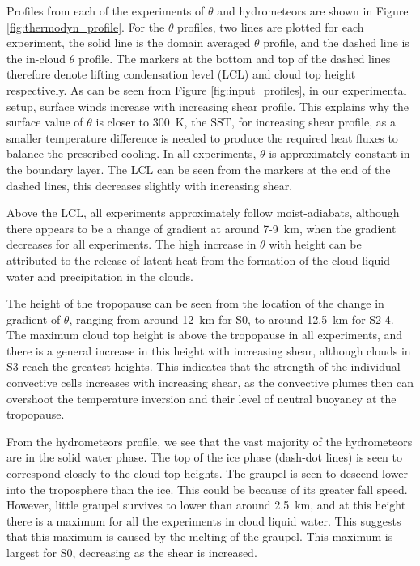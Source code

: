 \documentclass[11pt,a4paper]{article}
\newcommand\todo[1]{\textbf{TODO: #1}}
\begin{document}
Profiles from each of the experiments of $\theta$ and hydrometeors are shown in Figure \ref{fig:thermodyn_profile}. For the $\theta$ profiles, two lines are plotted for each experiment, the solid line is the domain averaged $\theta$ profile, and the dashed line is the in-cloud $\theta$ profile. The markers at the bottom and top of the dashed lines therefore denote lifting condensation level (LCL) and cloud top height respectively. As can be seen from Figure \ref{fig:input_profiles}, in our experimental setup, surface winds increase with increasing shear profile. This explains why the surface value of $\theta$ is closer to \SI{300}{K}, the SST, for increasing shear profile, as a smaller temperature difference is needed to produce the required heat fluxes to balance the prescribed cooling. In all experiments, $\theta$ is approximately constant in the boundary layer. The LCL can be seen from the markers at the end of the dashed lines, this decreases slightly with increasing shear. 

Above the LCL, all experiments approximately follow moist-adiabats,
although there appears to be a change of gradient at around \SI{7}{}-\SI{9}{km}, when the gradient decreases for all experiments. The high increase in $\theta$ with height can be attributed to the release of latent heat from the formation of the cloud liquid water and precipitation in the clouds.

The height of the tropopause can be seen from the location of the change in gradient of $\theta$, ranging from around \SI{12}{km} for S0, to around \SI{12.5}{km} for S2-4. The maximum cloud top height is above the tropopause in all experiments, and there is a general increase in this height with increasing shear, although clouds in S3 reach the greatest heights. This indicates that the strength of the individual convective cells increases with increasing shear, as the convective plumes then can overshoot the temperature inversion and their level of neutral buoyancy at the tropopause. 

From the hydrometeors profile, we see that the vast majority of the hydrometeors are in the solid water phase. The top of the ice phase (dash-dot lines) is seen to correspond closely to the cloud top heights. The graupel is seen to descend lower into the troposphere than the ice. This could be because of its greater fall speed. However, little graupel survives to lower than around \SI{2.5}{km}, and at this height there is a maximum for all the experiments in cloud liquid water. This suggests that this maximum is caused by the melting of the graupel. This maximum is largest for S0, decreasing as the shear is increased. 
\end{document}
